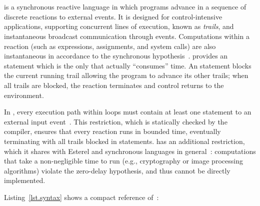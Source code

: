 \section{\CEU}
\label{sec.ceu}

\CEU is a synchronous reactive language in which programs advance in a sequence
of discrete reactions to external events.
%
It is designed for control-intensive applications, supporting concurrent lines
of execution, known as \emph{trails}, and instantaneous broadcast communication
through events.
%
Computations within a reaction (such as expressions, assignments, and
system calls) are also instantaneous in accordance to the synchronous
hypothesis~\cite{rp.hypothesis}.
%
\CEU provides an  statement which is the only that actually
``consumes'' time.
%
An  statement blocks the current running trail allowing the program
to advance its other trails; when all trails are blocked, the reaction
terminates and control returns to the environment.

In \CEU, every execution path within loops must contain at least one
 statement to an external input
event~\cite{ceu.sensys13,esterel.primer}.
%
This restriction, which is statically checked by the compiler, ensures that
every reaction runs in bounded time, eventually terminating with all trails
blocked in  statements.
%
\CEU has an additional restriction, which it shares with Esterel and
synchronous languages in general~\cite{esterel.preemption}: computations that
take a non-negligible time to run (e.g., cryptography or image processing
algorithms) violate the zero-delay hypothesis, and thus cannot be directly
implemented.

Listing~\ref{lst.syntax} shows a compact reference of~\CEU:

